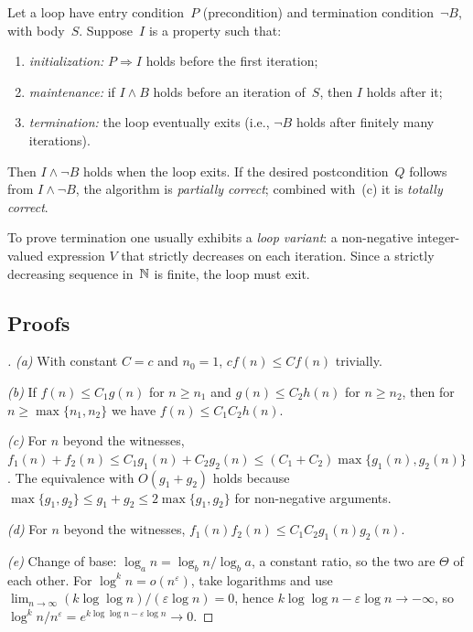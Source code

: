 \begin{theorem}
\label{thm:loop-invariant}
Let a loop have entry condition~$P$ (precondition) and termination
condition~$\neg B$, with body~$S$. Suppose~$I$ is a property such that:
\begin{enumerate}[label=(\alph*)]
  \item \emph{initialization:} $P \Rightarrow I$ holds before the first
        iteration;
  \item \emph{maintenance:} if $I \wedge B$ holds before an iteration
        of~$S$, then $I$ holds after it;
  \item \emph{termination:} the loop eventually exits (i.e., $\neg B$
        holds after finitely many iterations).
\end{enumerate}
Then $I \wedge \neg B$ holds when the loop exits. If the desired
postcondition~$Q$ follows from $I \wedge \neg B$, the algorithm is
\emph{partially correct}; combined with~(c) it is \emph{totally
correct}.
\end{theorem}

To prove termination one usually exhibits a \emph{loop variant}: a
non-negative integer-valued expression $V$ that strictly decreases on
each iteration. Since a strictly decreasing sequence in~$\mathbb{N}$ is
finite, the loop must exit.

\subsection*{Proofs}

\begin{proof}[]
\emph{(a)} With constant $C = c$ and $n_0 = 1$, $c f(n) \leq C f(n)$
trivially.

\emph{(b)} If $f(n) \leq C_1 g(n)$ for $n \geq n_1$ and
$g(n) \leq C_2 h(n)$ for $n \geq n_2$, then for
$n \geq \max\{n_1, n_2\}$ we have $f(n) \leq C_1 C_2 h(n)$.

\emph{(c)} For $n$ beyond the witnesses,
$f_1(n) + f_2(n) \leq C_1 g_1(n) + C_2 g_2(n) \leq (C_1 + C_2) \max\{g_1(n), g_2(n)\}$.
The equivalence with $O(g_1 + g_2)$ holds because
$\max\{g_1, g_2\} \leq g_1 + g_2 \leq 2 \max\{g_1, g_2\}$ for
non-negative arguments.

\emph{(d)} For $n$ beyond the witnesses,
$f_1(n) f_2(n) \leq C_1 C_2 g_1(n) g_2(n)$.

\emph{(e)} Change of base: $\log_a n = \log_b n / \log_b a$, a
constant ratio, so the two are $\Theta$ of each other. For
$\log^k n = o(n^\varepsilon)$, take logarithms and use
$\lim_{n \to \infty} (k \log \log n) / (\varepsilon \log n) = 0$, hence
$k \log \log n - \varepsilon \log n \to -\infty$, so
$\log^k n / n^\varepsilon = e^{k \log\log n - \varepsilon \log n} \to 0$.
\end{proof}

